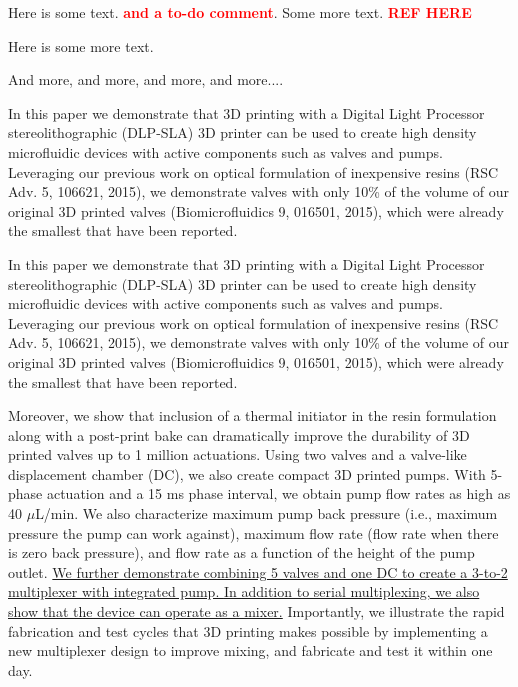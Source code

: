 \documentclass{article}
\newcommand{\todo}[1] {\textbf{\textcolor{red}{#1}}}
\newcommand{\rh}{\todo{REF HERE }}
\begin{document}
Here is some text. \todo{and a to-do comment}. Some more text. \rh

\cbstart
Here is some more text.
\cbend

And more, and more, and more, and more....


\cbstart
In this paper we demonstrate that 3D printing with a Digital Light Processor stereolithographic (DLP-SLA) 3D printer can be used to create high density microfluidic devices with active components such as valves and pumps. 
Leveraging our previous work on optical formulation of inexpensive resins (RSC Adv. 5, 106621, 2015), we demonstrate valves with only 10\% of the volume of our original 3D printed valves (Biomicrofluidics 9, 016501, 2015), which were already the smallest that have been reported. 
\cbend

In this paper we demonstrate that 3D printing with a Digital Light Processor stereolithographic (DLP-SLA) 3D printer can be used to create high density microfluidic devices with active components such as valves and pumps. 
\cbstart Leveraging our previous work on optical formulation of inexpensive resins (RSC Adv. 5, 106621, 2015), we demonstrate valves with only 10\% of the volume of our original 3D printed valves (Biomicrofluidics 9, 016501, 2015), \cbend which were already the smallest that have been reported. 

Moreover, we show that inclusion of a thermal initiator in the resin formulation along with a post-print bake can dramatically improve the durability of 3D printed valves up to 1 million actuations. 
\cbstart Using two valves and a valve-like displacement chamber (DC), we also create compact 3D printed pumps. 
\cbend
With 5-phase actuation and a 15 ms phase interval, we obtain pump flow rates as high as 40 $\mu$L/min. 
We also characterize maximum pump back pressure (i.e., maximum pressure the pump can work against), maximum flow rate (flow rate when there is zero back pressure), and flow rate as a function of the height of the pump outlet. \underline{We further demonstrate combining 5 valves and one DC to create a 3-to-2 multiplexer with integrated pump. } 
\ul{In addition to serial multiplexing, we also show that the device can operate as a mixer.} 
Importantly, we illustrate the rapid fabrication and test cycles that 3D printing makes possible by implementing a new multiplexer design to improve mixing, and fabricate and test it within one day.
\end{document}
